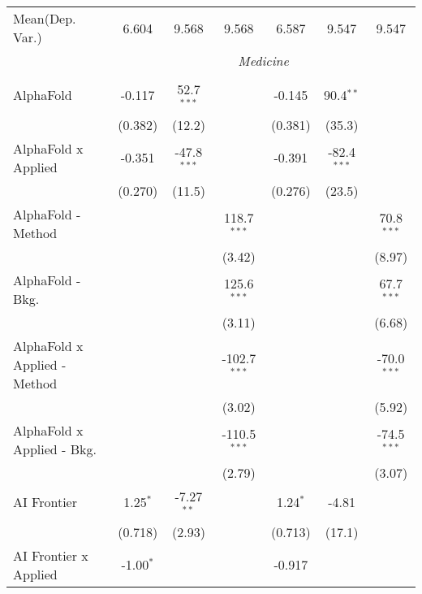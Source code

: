\begin{tabular}{lcccccc}
Mean(Dep. Var.) & 6.604 & 9.568 & 9.568 & 6.587 & 9.547 & 9.547 \\
 & \multicolumn{6}{c}{\textit{Medicine}} \\ \\
   AlphaFold                    & -0.117        & 52.7$^{***}$  &                & -0.145        & 90.4$^{**}$   &   \\   
                                & (0.382)       & (12.2)        &                & (0.381)       & (35.3)        &   \\   
   AlphaFold x Applied          & -0.351        & -47.8$^{***}$ &                & -0.391        & -82.4$^{***}$ &   \\   
                                & (0.270)       & (11.5)        &                & (0.276)       & (23.5)        &   \\   
   AlphaFold - Method           &               &               & 118.7$^{***}$  &               &               & 70.8$^{***}$\\   
                                &               &               & (3.42)         &               &               & (8.97)\\   
   AlphaFold - Bkg.             &               &               & 125.6$^{***}$  &               &               & 67.7$^{***}$\\   
                                &               &               & (3.11)         &               &               & (6.68)\\   
   AlphaFold x Applied - Method &               &               & -102.7$^{***}$ &               &               & -70.0$^{***}$\\   
                                &               &               & (3.02)         &               &               & (5.92)\\   
   AlphaFold x Applied - Bkg.   &               &               & -110.5$^{***}$ &               &               & -74.5$^{***}$\\   
                                &               &               & (2.79)         &               &               & (3.07)\\   
   AI Frontier                  & 1.25$^{*}$    & -7.27$^{**}$  &                & 1.24$^{*}$    & -4.81         &   \\   
                                & (0.718)       & (2.93)        &                & (0.713)       & (17.1)        &   \\   
   AI Frontier x Applied        & -1.00$^{*}$   &               &                & -0.917        &               &   \\   

\end{tabular}
